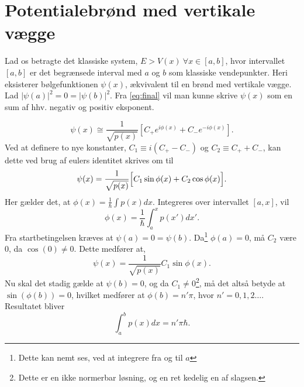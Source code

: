 \section{Potentialebrønd med vertikale vægge}
Lad os betragte det klassiske system, $E > V(x) \ \forall x \in[a,b]$, hvor intervallet $[a,b]$ er det begrænsede interval med $a$ og $b$ som klassiske vendepunkter. Heri eksisterer bølgefunktionen $\psi(x)$, ækvivalent til en brønd med vertikale vægge. Lad $|\psi(a)|^{2} = 0 = |\psi(b)|^{2}$. Fra \cref{eq:final} vil man kunne skrive $\psi(x)$ som en sum af hhv. negativ og positiv eksponent.

\begin{equation}
    \psi(x) \cong \frac{1}{\sqrt{p(x)}}\left[C_{+}e^{i\phi(x)}+C_{-}e^{-i\phi(x)}\right].
  \label{eq:kvantiseringStart}
\end{equation}
Ved at definere to nye konstanter, $C_1 \equiv i(C_{+}-C_{-})$ og $C_2 \equiv C_{+}+C_{-}$, kan dette ved brug af eulers identitet skrives om til
\begin{equation}
  \psi(x) = \frac{1}{\sqrt{p(x)}}
  \Bigl[    C_1\sin{\phi(x)} + C_2\cos{\phi(x)}   \Bigr].
  \label{eq:kvantiseringSinCos}
\end{equation}
Her gælder det, at $\phi(x) = \frac{1}{\hbar}\int p(x) dx$. Integreres over intervallet $[a, x]$, vil
\begin{equation}
  \phi(x) = \frac{1}{\hbar}\int_{a}^{x} p(x')dx'.
\end{equation}
Fra startbetingelsen kræves at $\psi(a) = 0 = \psi(b)$. Da\footnote{Dette kan nemt ses, ved at integrere fra og til $a$} $\phi(a) = 0$, må $C_2$ være 0, da $\cos(0)\neq 0$. Dette medfører at,
\begin{equation}
    \psi(x) = \frac{1}{\sqrt{p(x)}}C_1\sin{\phi(x)}.
\end{equation}
Nu skal det stadig gælde at $\psi(b) = 0$, og da $C_1\neq 0$\footnote{Dette er en ikke normerbar løsning, og en ret kedelig en af slagsen.}, må det altså betyde at $\sin(\phi(b)) = 0$, hvilket medfører at $\phi(b) = n'\pi$, hvor $n' = 0, 1, 2\ldots$.
Resultatet bliver
\begin{equation}
  \int_{a}^{b} p(x) dx = n'\pi\hbar.
  \label{eq:kvantiDone}
\end{equation}
